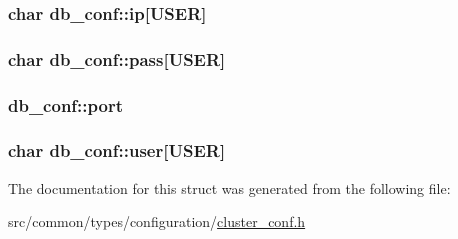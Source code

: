 \subsubsection[{\texorpdfstring{ip}{ip}}]{\setlength{\rightskip}{0pt plus 5cm}char db\+\_\+conf\+::ip\mbox{[}{\bf U\+S\+ER}\mbox{]}}\hypertarget{structdb__conf_a45e0cfabfe7401704cdf48ba876ee58e}{}\label{structdb__conf_a45e0cfabfe7401704cdf48ba876ee58e}
\subsubsection[{\texorpdfstring{pass}{pass}}]{\setlength{\rightskip}{0pt plus 5cm}char db\+\_\+conf\+::pass\mbox{[}{\bf U\+S\+ER}\mbox{]}}\hypertarget{structdb__conf_adf6dc17b9c5009dac8b8fed9ff92ec15}{}\label{structdb__conf_adf6dc17b9c5009dac8b8fed9ff92ec15}
\subsubsection[{\texorpdfstring{port}{port}}]{ db\+\_\+conf\+::port}\hypertarget{structdb__conf_a491eb9a91ffa3e237d685a15d2720d5d}{}\label{structdb__conf_a491eb9a91ffa3e237d685a15d2720d5d}
\subsubsection[{\texorpdfstring{user}{user}}]{\setlength{\rightskip}{0pt plus 5cm}char db\+\_\+conf\+::user\mbox{[}{\bf U\+S\+ER}\mbox{]}}\hypertarget{structdb__conf_a765b7448118bab330a3877876e8d3654}{}\label{structdb__conf_a765b7448118bab330a3877876e8d3654}


The documentation for this struct was generated from the following file\+:\begin{DoxyCompactItemize}
\item 
src/common/types/configuration/\hyperlink{cluster__conf_8h}{cluster\+\_\+conf.\+h}\end{DoxyCompactItemize}
